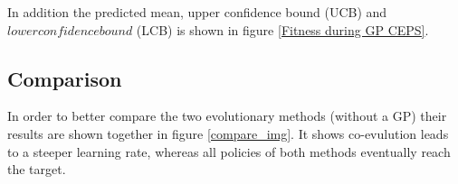 In addition the predicted mean, upper confidence bound (UCB) and $lower confidence bound$ (LCB) is shown in figure \ref{Fitness during GP CEPS}. 



\subsection{Comparison}
In order to better compare the two evolutionary methods (without a GP) their results are shown together in figure \ref{compare_img}. It shows co-evulution leads to a steeper learning rate, whereas all policies of both methods eventually reach the target.



